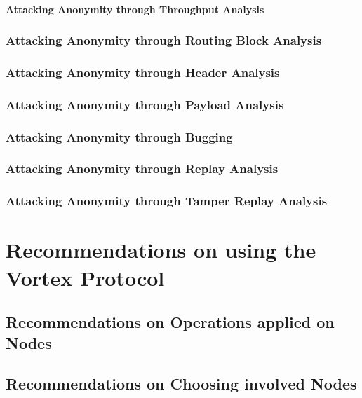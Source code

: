 \subsubsection{Attacking Anonymity through Throughput Analysis}

\subsection{Attacking Anonymity through Routing Block Analysis}

\subsection{Attacking Anonymity through Header Analysis}

\subsection{Attacking Anonymity through Payload Analysis}

\subsection{Attacking Anonymity through Bugging}

\subsection{Attacking Anonymity through Replay Analysis}

\subsection{Attacking Anonymity through Tamper Replay Analysis}

\chapter{Recommendations on using the Vortex Protocol}

\section{Recommendations on Operations applied on Nodes}

\section{Recommendations on Choosing involved Nodes}

